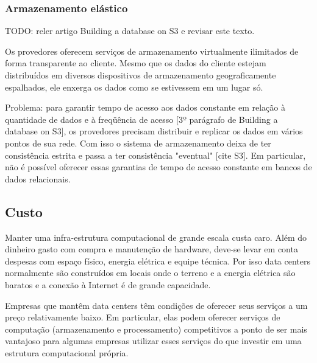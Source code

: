 \subsubsection{Armazenamento elástico}

TODO: reler artigo Building a database on S3 e revisar este texto.

Os provedores oferecem serviços de armazenamento virtualmente ilimitados de forma transparente ao cliente. Mesmo que os dados do cliente estejam distribuídos em diversos dispositivos de armazenamento geograficamente espalhados, ele enxerga os dados como se estivessem em um lugar só.

Problema: para garantir tempo de acesso aos dados constante em relação à quantidade de dados e à freqüência de acesso [3º parágrafo de Building a database on S3], os provedores precisam distribuir e replicar os dados em vários pontos de sua rede. Com isso o sistema de armazenamento deixa de ter consistência estrita e passa a ter consistência "eventual" [cite S3]. Em particular, não é possível oferecer essas garantias de tempo de acesso constante em bancos de dados relacionais.


\subsection{Custo}

Manter uma infra-estrutura computacional de grande escala custa caro. Além do dinheiro gasto com compra e manutenção de hardware, deve-se levar em conta despesas com espaço físico, energia elétrica e equipe técnica. Por isso data centers normalmente são construídos em locais onde o terreno e a energia elétrica são baratos e a conexão à Internet é de grande capacidade. 

Empresas que mantêm data centers 
têm condições de oferecer seus serviços a um preço relativamente baixo. Em particular, elas podem oferecer serviços de computação (armazenamento e processamento) competitivos a ponto de ser mais vantajoso para algumas empresas utilizar esses serviços do que investir em uma estrutura computacional própria.


